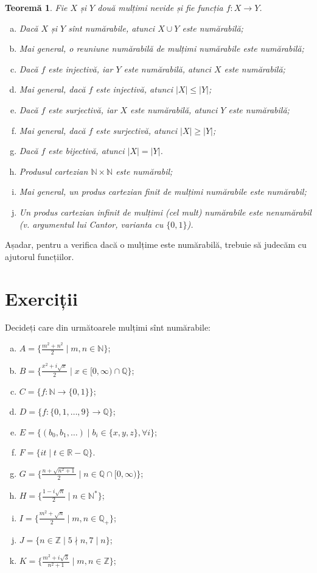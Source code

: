 \documentclass[11pt,a4paper]{article}
\newcommand\NN{\mathbb{N}}
\newcommand\RR{\mathbb{R}}
\newcommand\ZZ{\mathbb{Z}}
\newcommand\QQ{\mathbb{Q}}
\theoremstyle{dotless}
\newtheorem{theorem}{Teorem\u{a}}[section]
\theoremstyle{dotlessdr}
\begin{document}
\begin{theorem}\label{thm:num}
  Fie $X$ și $Y$ două mulțimi nevide și fie funcția $f : X \to Y$.
  \begin{enumerate}[(a)]
  \item Dacă $X$ și $Y$ sînt numărabile, atunci $X \cup Y$ este numărabilă;
  \item Mai general, o reuniune numărabilă de mulțimi numărabile este numărabilă;
  \item Dacă $f$ este injectivă, iar $Y$ este numărabilă, atunci $X$ este numărabilă;
  \item Mai general, dacă $f$ este injectivă, atunci $|X| \leq |Y|$;
  \item Dacă $f$ este surjectivă, iar $X$ este numărabilă, atunci $Y$ este
    numărabilă;
  \item Mai general, dacă $f$ este surjectivă, atunci $|X| \geq |Y|$;
  \item Dacă $f$ este bijectivă, atunci $| X | = | Y |$.
  \item Produsul cartezian $\NN \times \NN$ este numărabil;
  \item Mai general, un produs cartezian \emph{finit} de mulțimi numărabile este
    numărabil;
  \item Un produs cartezian infinit de mulțimi (cel mult) numărabile
    este \emph{nenumărabil} (v. argumentul lui Cantor, varianta cu $\{ 0, 1 \}$).
  \end{enumerate}
\end{theorem}

Așadar, pentru a verifica dacă o mulțime este numărabilă, trebuie să judecăm
cu ajutorul funcțiilor.



\section{Exerciții}
\label{sec:exc}

Decideți care din următoarele mulțimi sînt numărabile:
\begin{enumerate}[(a)]
\item $A = \{ \frac{m^2 + n^2}{2} \mid m, n \in \NN \}$;
\item $B = \{ \frac{x^2 + i\sqrt{x}}{2} \mid x \in [0, \infty) \cap \QQ \}$;
\item $C = \{ f : \NN \to \{ 0, 1 \} \}$;
\item $D = \{ f : \{0, 1, \dots, 9 \} \to \QQ \}$;
\item $E = \{ (b_0, b_1, \dots) \mid b_i \in \{ x, y, z \}, \forall i \}$;
\item $F = \{ it \mid t \in \RR - \QQ \}$.
\item $G = \{ \frac{n + \sqrt{n^2 + 1}}{2} \mid n \in \QQ \cap [0, \infty) \}$;
\item $H = \{ \frac{1 - i\sqrt{n}}{2} \mid n \in \NN^\ast \}$;
\item $I = \{ \frac{m^2 + \sqrt{n}}{2} \mid m, n \in \QQ_+ \}$;
\item $J = \{ n \in \ZZ \mid 5 \nmid n, 7 \mid n \}$;
\item $K = \{ \frac{m^2 + i\sqrt{3}}{n^2 + 1} \mid m, n \in \ZZ \}$;
\end{enumerate}
\end{document}
